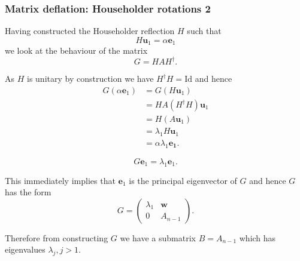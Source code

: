 \documentclass{beamer}
\newcommand{\bfm}[1]{{\boldsymbol{#1}}}
\begin{document}
\begin{frame}
  \frametitle{Matrix deflation: Householder rotations 2}

  Having constructed the Householder reflection $H$ such that
  \begin{equation*}
    H \bfm{u}_1 = \alpha \bfm{e}_1
  \end{equation*}
  we look at the behaviour of the matrix
  \begin{equation*}
    G = H A H^{\dagger}.
  \end{equation*} \pause
  \begin{overlayarea}{\textwidth}{0.6\textheight}
    {

      As $H$ is unitary by construction we have $H^{\dagger} H =
      \text{Id}$ and hence
      \begin{align*}
        G \left( \alpha \bfm{e}_1 \right) & = G \left( H \bfm{u}_1
        \right)
        \\
        & = H A \left( H^{\dagger} H \right) \bfm{u}_1 \\
        & = H \left( A \bfm{u}_1 \right) \\
        & = \lambda_1 H \bfm{u}_1 \\
        & = \alpha \lambda_1 \bfm{e_1}.
      \end{align*}
    }
    {
      \begin{equation*}
        G \bfm{e}_1 = \lambda_1 \bfm{e}_1.
      \end{equation*}

      This immediately implies that $\bfm{e}_1$ is the principal
      eigenvector of $G$ and hence $G$ has the form
      \begin{equation*}
        G = \left(
          \begin{array}{c|c}
            \lambda_1 & \bfm{w} \\ \hline
            0 & A_{n-1}
          \end{array}
        \right).
      \end{equation*}
    }
    {
      Therefore from constructing $G$ we have a submatrix $B =
      A_{n-1}$ which has eigenvalues $\lambda_j, j>1$.
    }
  \end{overlayarea}

\end{frame}
\end{document}
